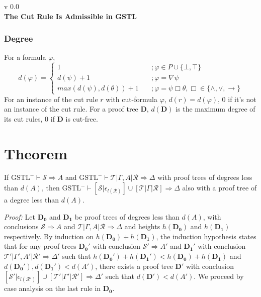 \documentclass[a4paper, 12pt]{paper}
\begin{document}
{\noindent
	v 0.0 \\
{\large\textbf{The Cut Rule Is Admissible in GSTL}}
}
\\


\subsubsection{Degree} For a formula $\varphi$,
\[ d(\varphi) = \begin{cases}
	1 & \quad ; \varphi \in P \cup \{ \bot, \top \} \\
	d(\psi) + 1 & \quad ; \varphi = \nabla \psi \\
	max(d(\psi), d(\theta)) + 1 & \quad ; \varphi = \psi \Box \theta, \Box \in \{ \land , \lor, \rightarrow \}
\end{cases} \]
For an instance of the cut rule $r$ with cut-formula $\varphi$, $d(r) = d(\varphi)$, $0$ if it's not an instance of the cut rule.
For a proof tree $\mathbf{D}$, $d(\mathbf{D})$ is the maximum degree of its cut rules, $0$ if $\mathbf{D}$ is cut-free.
\pagebreak

\section{Theorem}\label{cut-admis} If $\text{GSTL}^-\vdash \mathcal{S} \Rightarrow A$ and $\text{GSTL}^-\vdash \mathcal{T} | \Gamma, A | \mathcal{R} \Rightarrow \Delta$ with proof trees of degrees less than $d(A)$, then
 $\text{GSTL}^-\vdash [ \mathcal{S} | \epsilon_{l(\mathcal{R})} ] \cup [ \mathcal{T} | \Gamma | \mathcal{R} ] \Rightarrow \Delta$ also with a proof tree of a degree less than $d(A)$.
 
\emph{Proof:}
Let $\mathbf{D_0}$ and $\mathbf{D_1}$ be proof trees of degrees less than $d(A)$, with conclusions $\mathcal{S} \Rightarrow A$ and $\mathcal{T} | \Gamma, A | \mathcal{R} \Rightarrow \Delta$ and heights $h(\mathbf{D_0})$ and $h(\mathbf{D_1})$ respectively. By induction on $h(\mathbf{D_0}) + h(\mathbf{D_1})$, the induction hypothesis states that for any proof trees $\mathbf{D_0}'$ with conclusion $\mathcal{S}' \Rightarrow A'$ and $\mathbf{D_1}'$ with conclusion $\mathcal{T}' | \Gamma', A' | \mathcal{R}' \Rightarrow \Delta'$ such that $h(\mathbf{D_0}') + h(\mathbf{D_1}') < h(\mathbf{D_0}) + h(\mathbf{D_1})$ and $d(\mathbf{D_0}'),d(\mathbf{D_1}') < d(A')$, there exists a proof tree $\mathbf{D}'$ with conclusion $[ \mathcal{S}' | \epsilon_{l(\mathcal{R}')} ] \cup [ \mathcal{T}' | \Gamma' | \mathcal{R}' ] \Rightarrow \Delta'$ such that $d(\mathbf{D}') < d(A')$. We proceed by case analysis on the last rule in $\mathbf{D_0}$.
\end{document}
